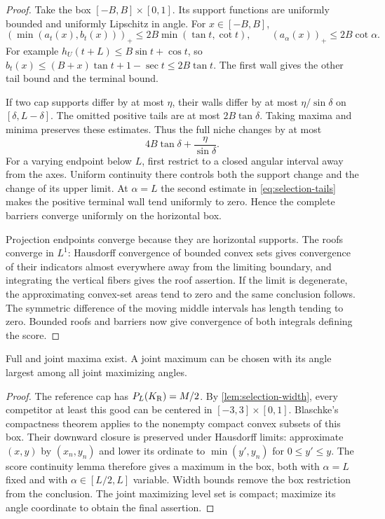 \begin{proof}
Take the box $[-B,B]\times[0,1]$. Its support functions are uniformly
bounded and uniformly Lipschitz in angle. For $x\in[-B,B]$,
\begin{equation}\label{eq:selection-tails}
 (\min(a_t(x),b_t(x)))_+\le2B\min(\tan t,\cot t),\qquad
 (a_\alpha(x))_+\le2B\cot\alpha.
\end{equation}
For example $h_U(t+L)\le B\sin t+\cos t$, so
$b_t(x)\le(B+x)\tan t+1-\sec t\le2B\tan t$.
The first wall gives the other tail bound and the terminal bound.

If two cap supports differ by at most $\eta$, their walls differ by
at most $\eta/\sin\delta$ on $[\delta,L-\delta]$.
The omitted positive tails are at most $2B\tan\delta$. Taking
maxima and minima preserves these estimates. Thus the full niche
changes by at most
\[
 4B\tan\delta+\frac{\eta}{\sin\delta}.
\]
For a varying endpoint below $L$, first restrict to a closed angular
interval away from the axes. Uniform continuity there controls both
the support change and the change of its upper limit. At $\alpha=L$
the second estimate in \eqref{eq:selection-tails} makes the positive
terminal wall tend uniformly to zero. Hence the complete barriers
converge uniformly on the horizontal box.

Projection endpoints converge because they are horizontal supports.
The roofs converge in $L^1$: Hausdorff convergence of bounded convex
sets gives convergence of their indicators almost everywhere away
from the limiting boundary, and integrating the vertical fibers gives
the roof assertion. If the limit is degenerate, the approximating
convex-set areas tend to zero and the same conclusion follows.
The symmetric difference of the moving middle intervals has length
tending to zero. Bounded roofs and barriers now give convergence of
both integrals defining the score.
\end{proof}

\begin{proposition}[Attainment]\label{lem:selection-maximum}
Full and joint maxima exist. A joint maximum can be chosen with its
angle largest among all joint maximizing angles.
\end{proposition}

\begin{proof}
The reference cap has $P_L(K_{\mathrm R})=M/2$. By
\cref{lem:selection-width}, every competitor at least this good can
be centered in $[-3,3]\times[0,1]$. Blaschke's compactness theorem
applies to the nonempty compact convex subsets of this box. Their
downward closure is preserved under Hausdorff limits: approximate
$(x,y)$ by $(x_n,y_n)$ and lower its ordinate to
$\min(y',y_n)$ for $0\le y'\le y$.
The score continuity lemma therefore gives a maximum in the box,
both with $\alpha=L$ fixed and with $\alpha\in[L/2,L]$ variable.
Width bounds remove the box restriction from the conclusion.
The joint maximizing level set is compact; maximize its angle
coordinate to obtain the final assertion.
\end{proof}


